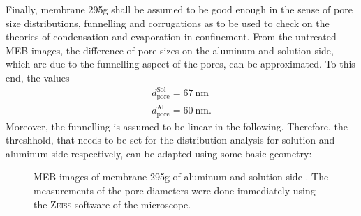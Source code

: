 \documentclass[thesis.tex]{subfiles}
\begin{document}
              Finally, membrane 295g shall be assumed to be good enough in the sense of pore size distributions, funnelling and corrugations as to be used to check on the theories of condensation and evaporation in confinement. From the untreated MEB images, the difference of pore sizes on the aluminum and solution side, which are due to the funnelling aspect of the pores, can be approximated. To this end, the values
              \begin{equation}
                \begin{split}
                  d_\mathrm{pore}^\mathrm{Sol}=\SI{67}{\nano\meter}  \\
                  d_\mathrm{pore}^\mathrm{Al}=\SI{60}{\nano\meter}.
                \end{split}
                \label{eq:295g_pore_sizes}
              \end{equation}
              Moreover, the funnelling is assumed to be linear in the following. Therefore, the threshhold, that needs to be set for the distribution analysis for solution and aluminum side respectively, can be adapted using some basic geometry:
              \medskip

              \begin{figure}[htp]
                \centering
                \hfill
                \caption{MEB images of membrane 295g of aluminum \protect{} and solution side \protect{}. The measurements of the pore diameters were done immediately using the \textsc{Zeiss} software of the microscope.}
                \label{fig:MEB_295g}
              \end{figure}
\end{document}
